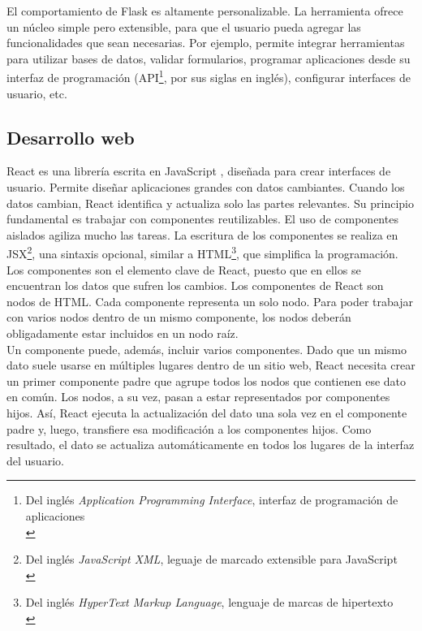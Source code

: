 \documentclass[a4paper,12pt]{article}
\begin{document}
El comportamiento de Flask es altamente personalizable. La herramienta ofrece un núcleo simple pero extensible, para que el usuario pueda agregar las funcionalidades que sean necesarias. Por ejemplo, permite integrar herramientas para utilizar bases de datos, validar formularios, programar aplicaciones desde su interfaz de programación (API\footnote{Del inglés \emph{Application Programming Interface}, interfaz de programación de aplicaciones\\}, por sus siglas en inglés), configurar interfaces de usuario, etc.\\

\subsection{Desarrollo web}
\label{sec:orgheadline17}

React es una librería escrita en JavaScript \cite{JavaScript}, diseñada para crear interfaces de usuario. Permite diseñar aplicaciones grandes con datos cambiantes. Cuando los datos cambian, React identifica y actualiza solo las partes relevantes. Su principio fundamental es trabajar con componentes reutilizables. El uso de componentes aislados agiliza mucho las tareas. La escritura de los componentes se realiza en JSX\footnote{Del inglés \emph{JavaScript XML}, leguaje de marcado extensible para JavaScript\\}, una sintaxis opcional, similar a HTML\footnote{Del inglés \emph{HyperText Markup Language}, lenguaje de marcas de hipertexto\\}, que simplifica la programación.\\

Los componentes son el elemento clave de React, puesto que en ellos se encuentran los datos que sufren los cambios. Los componentes de React son nodos de HTML. Cada componente representa un solo nodo. Para poder trabajar con varios nodos dentro de un mismo componente, los nodos deberán obligadamente estar incluidos en un nodo raíz.\\

Un componente puede, además, incluir varios componentes. Dado que un mismo dato suele usarse en múltiples lugares dentro de un sitio web, React necesita crear un primer componente padre que agrupe todos los nodos que contienen ese dato en común. Los nodos, a su vez, pasan a estar representados por componentes hijos. Así, React ejecuta la actualización del dato una sola vez en el componente padre y, luego, transfiere esa modificación a los componentes hijos. Como resultado, el dato se actualiza automáticamente en todos los lugares de la interfaz del usuario.\\
\end{document}
